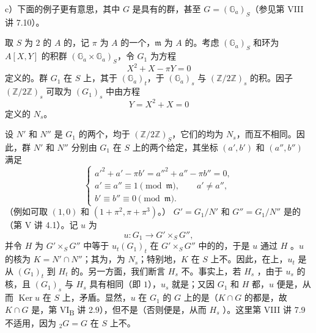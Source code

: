  c）下面的例子更有意思，其中 $G$ 是具有的群，甚至 $G=(\mathbb G_a)_S$（参见第 VIII 讲 7.10）。

取 $S$ 为 $2$ 的 $A$ 的，记 $\pi$ 为 $A$ 的一个，$\mathfrak m$ 为 $A$ 的。考虑 $(\mathbb G_a)_S$ 和环为 $A[X,Y]$ 的积群 $(\mathbb G_a\times\mathbb G_a)_S$，令 $G_1$ 为方程
\[X^2+X-\pi Y=0\tag{1}\]
定义的。群 $G_1$ 在 $S$ 上，其于 $(\mathbb G_a)_t$，于 $(\mathbb G_a)_s$ 与 $(\mathbb Z/2\mathbb Z)_s$ 的积。因子 $(\mathbb Z/2\mathbb Z)_s$ 可取为 $(G_1)_s$ 中由方程
\[Y=X^2+X=0\tag{2}\]
定义的 $N_s$。

设 $N'$ 和 $N''$ 是 $G_1$ 的两个，均于 $(\mathbb Z/2\mathbb Z)_S$，它们的均为 $N_s$，而互不相同。因此，群 $N'$ 和 $N''$ 分别由 $G_1$ 在 $S$ 上的两个给定，其坐标 $(a',b')$ 和 $(a'',b'')$ 满足
\[
\begin{cases}
 a'^2+a'-\pi b'=a''^2+a''-\pi b''=0,\\
 a'\equiv a''\equiv1\pmod{\mathfrak m},\qquad a'\ne a'',\\
 b'\equiv b''\equiv0\pmod{\mathfrak m}.
\end{cases}\tag{3}
\]
（例如可取 $(1,0)$ 和 $(1+\pi^2,\pi+\pi^3)$。） $G'=G_1/N'$ 和 $G''=G_1/N''$ 是的（第 V 讲 4.1）。记 $u$ 为
\[u:G_1\longrightarrow G'\times_S G'',\]
并令 $H$ 为 $G'\times_S G''$ 中等于 $u_t(G_1)_t$ 在 $G'\times_S G''$ 中的的，于是 $u$ 通过 $H$ 。$u$ 的核为 $K=N'\cap N''$；其为，为 $N_s$；特别地，$K$ 在 $S$ 上不。因此，在上，$u_t$ 是从 $(G_1)_t$ 到 $H_t$ 的。另一方面，我们断言 $H_s$ 不。事实上，若 $H_s$ ，由于 $u_s$ 的核，且 $(G_1)_s$ 与 $H_s$ 具有相同（即 $1$），$u_s$ 就是；又因 $G_1$ 和 $H$ 都，$u$ 便是，从而 $\operatorname{Ker}u$ 在 $S$ 上，矛盾。显然，$u$ 在 $G_1$ 的 $G$ 上的是（$K\cap G$ 的都是，故 $K\cap G$ 是，第 VI\textsubscript{B} 讲 2.9），但不是（否则便是，从而 $H_s$ ）。这里第 VIII 讲 7.9 不适用，因为 ${}_2G=G$ 在 $S$ 上不。

